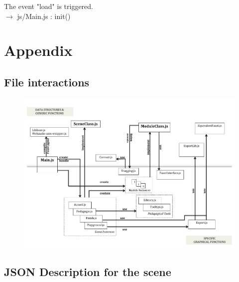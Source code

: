 \documentclass[a4paper]{article}
\begin{document}
The event "load" is triggered.\\
$ \rightarrow$ js/Main.js : init()






\section{Appendix}
\subsection{File interactions}
\begin{landscape}
\begin{figure}[!h]
\begin{center}
\includegraphics[width=\columnwidth]{images/ClassDiagram.pdf}
\label{fig:classes}
\end{center}
\end{figure}
\end{landscape}

\subsection{JSON Description for the scene}
\end{document}
